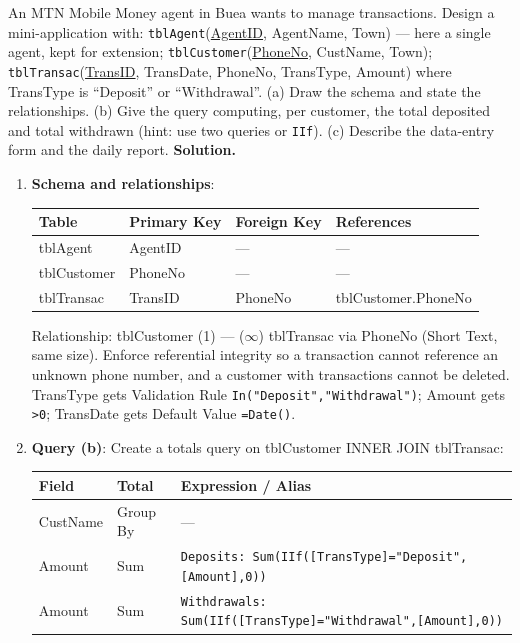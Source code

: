 \documentclass[11pt]{article}
\begin{document}
\begin{exoresolu}
An MTN Mobile Money agent in Buea wants to manage transactions. Design a mini-application with: \texttt{tblAgent}(\underline{AgentID}, AgentName, Town) --- here a single agent, kept for extension; \texttt{tblCustomer}(\underline{PhoneNo}, CustName, Town); \texttt{tblTransac}(\underline{TransID}, TransDate, PhoneNo, TransType, Amount) where TransType is ``Deposit'' or ``Withdrawal''.
(a) Draw the schema and state the relationships. (b) Give the query computing, per customer, the total deposited and total withdrawn (hint: use two queries or \texttt{IIf}). (c) Describe the data-entry form and the daily report.
\tcblower
\textbf{Solution.}
\begin{enumerate}
\item \textbf{Schema and relationships}:
\begin{center}
\begin{tabular}{|l|l|l|l|}
\hline
\rowcolor{popblueL} \textbf{Table} & \textbf{Primary Key} & \textbf{Foreign Key} & \textbf{References} \\
\hline
tblAgent & AgentID & --- & --- \\
\hline
tblCustomer & PhoneNo & --- & --- \\
\hline
tblTransac & TransID & PhoneNo & tblCustomer.PhoneNo \\
\hline
\end{tabular}
\end{center}
Relationship: tblCustomer (1) --- ($\infty$) tblTransac via PhoneNo (Short Text, same size). Enforce referential integrity so a transaction cannot reference an unknown phone number, and a customer with transactions cannot be deleted. TransType gets Validation Rule \texttt{In("Deposit","Withdrawal")}; Amount gets \texttt{>0}; TransDate gets Default Value \texttt{=Date()}.
\item \textbf{Query (b)}: Create a totals query on tblCustomer INNER JOIN tblTransac:
\begin{center}
\begin{tabularx}{\linewidth}{|l|X|X|}
\hline
\rowcolor{popblueL} \textbf{Field} & \textbf{Total} & \textbf{Expression / Alias} \\
\hline
CustName & Group By & --- \\
\hline
Amount & Sum & \texttt{Deposits: Sum(IIf([TransType]="Deposit",[Amount],0))} \\
\hline
Amount & Sum & \texttt{Withdrawals: Sum(IIf([TransType]="Withdrawal",[Amount],0))} \\

\end{tabularx}
\end{center}
\end{enumerate}
\end{exoresolu}
\end{document}
